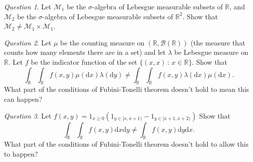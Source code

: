 \documentclass[11pt]{article}
\theoremstyle{definition}
\theoremstyle{remark}
\newtheorem{q}{Question}
\newenvironment{ans}{\paragraph{Answer:}}{\hfill$\square$\vspace{10pt}}
\begin{document}
\begin{q}
Let $\mathcal{M}_1$ be the $\sigma$-algebra of Lebesgue measurable subsets of $\mathbb{R}$, and $\mathcal{M}_2$ be the $\sigma$-algebra of Lebesgue measurable subsets of $\mathbb{R}^2$. Show that $\mathcal{M}_2 \neq \mathcal{M}_1 \times \mathcal{M}_1$. 
\end{q}

\begin{q}
Let $\mu$ be the counting measure on $(\mathbb{R}, \mathcal{B}(\mathbb{R}))$ (the measure that counts how many elements there are in a set) and let $\lambda$ be Lebesgue measure on $\mathbb{R}$. Let $f$ be the indicator function of the set $\{(x,x) \,:\, x \in \mathbb{R}\}$. Show that
\[ \int_\mathbb{R} \int_\mathbb{R} f(x,y) \mu(\mathrm{d}x) \lambda(\mathrm{d}y) \neq \int_\mathbb{R} \int_\mathbb{R}  f(x,y) \lambda(\mathrm{d}x) \mu(\mathrm{d}x). \] What part of the conditions of Fubini-Tonelli theorem doesn't hold to mean this can happen?
\end{q}

\begin{q}
Let $f(x,y) = 1_{x \geq 0}( 1_{y \in [x,x+1)} - 1_{y \in [x+1, x+2)})$ Show that
\[ \int_\mathbb{R} \int_\mathbb{R} f(x,y) \mathrm{d}x \mathrm{d}y \neq \int_\mathbb{R} f(x,y) \mathrm{d}y \mathrm{d}x. \] What part of the conditions of Fubini-Tonelli theorem doesn't hold to allow this to happen?
\end{q}
\end{document}
